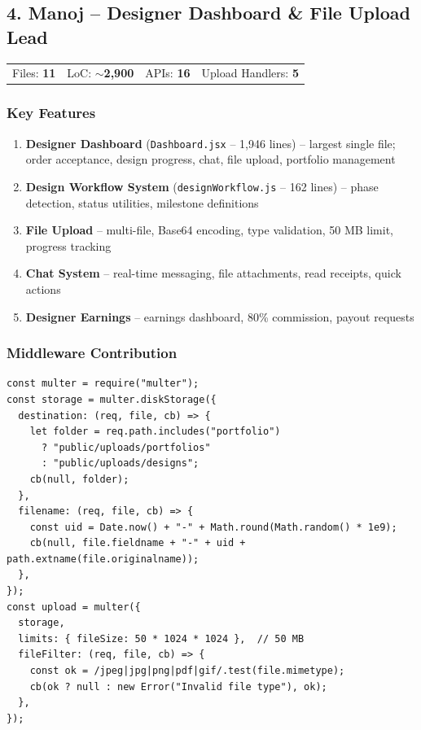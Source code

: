 \documentclass[a4paper,11pt]{article}
\begin{document}
\subsection{\textcolor{manojCol}{4. Manoj} -- Designer Dashboard \& File Upload Lead}

\begin{mdframed}[linecolor=manojCol!60, backgroundcolor=manojCol!5, roundcorner=4pt]
\begin{tabular}{@{}L{3cm}L{3cm}L{3cm}L{3cm}@{}}
  Files: \textbf{11} & LoC: \textbf{$\sim$2,900} & APIs: \textbf{16} & Upload Handlers: \textbf{5}
\end{tabular}
\end{mdframed}

\subsubsection{Key Features}
\begin{enumerate}[noitemsep]
  \item \textbf{Designer Dashboard} (\texttt{Dashboard.jsx} -- 1,946 lines) -- largest single file;
        order acceptance, design progress, chat, file upload, portfolio management
  \item \textbf{Design Workflow System} (\texttt{designWorkflow.js} -- 162 lines) -- phase detection,
        status utilities, milestone definitions
  \item \textbf{File Upload} -- multi-file, Base64 encoding, type validation, 50 MB limit, progress tracking
  \item \textbf{Chat System} -- real-time messaging, file attachments, read receipts, quick actions
  \item \textbf{Designer Earnings} -- earnings dashboard, 80\% commission, payout requests
\end{enumerate}

\subsubsection{Middleware Contribution}
\begin{lstlisting}[caption={Multer File Upload (Manoj)}]
const multer = require("multer");
const storage = multer.diskStorage({
  destination: (req, file, cb) => {
    let folder = req.path.includes("portfolio")
      ? "public/uploads/portfolios"
      : "public/uploads/designs";
    cb(null, folder);
  },
  filename: (req, file, cb) => {
    const uid = Date.now() + "-" + Math.round(Math.random() * 1e9);
    cb(null, file.fieldname + "-" + uid + path.extname(file.originalname));
  },
});
const upload = multer({
  storage,
  limits: { fileSize: 50 * 1024 * 1024 },  // 50 MB
  fileFilter: (req, file, cb) => {
    const ok = /jpeg|jpg|png|pdf|gif/.test(file.mimetype);
    cb(ok ? null : new Error("Invalid file type"), ok);
  },
});
\end{lstlisting}
\end{document}
